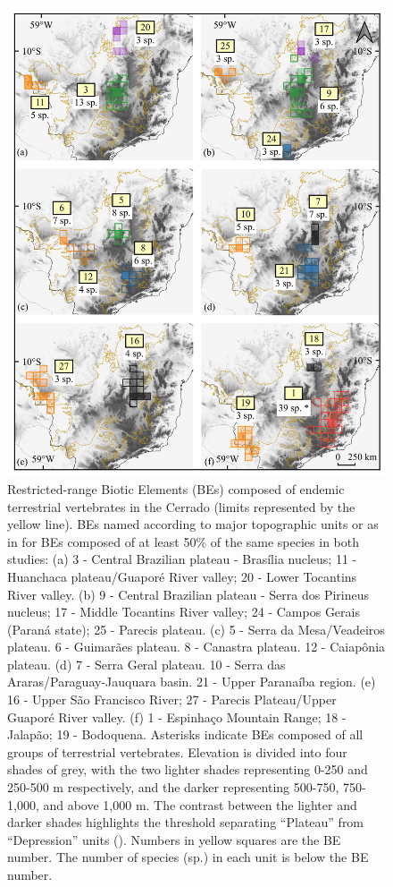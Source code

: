 \documentclass[12pt,openright,oneside,a4paper,english]{abntex2}
\begin{document}
\begin{figure}[H]
	\centering
	\includegraphics[width=150mm]{Fig c2-1}
	\caption[Restricted-range Biotic Elements (BEs)]{\footnotesize Restricted-range Biotic Elements (BEs) composed of endemic terrestrial vertebrates in the Cerrado (limits represented by the yellow line). BEs named according to major topographic units or as in \citet{Azevedo2016} for BEs composed of at least 50\% of the same species in both studies: (a) 3 - Central Brazilian plateau - Brasília nucleus; 11 - Huanchaca plateau/Guaporé River valley; 20 - Lower Tocantins River valley. (b) 9 - Central Brazilian plateau - Serra dos Pirineus nucleus; 17 - Middle Tocantins River valley; 24 - Campos Gerais (Paraná state); 25 - Parecis plateau. (c) 5 - Serra da Mesa/Veadeiros plateau. 6 - Guimarães plateau. 8 - Canastra plateau. 12 - Caiapônia plateau. (d) 7 - Serra Geral plateau. 10 - Serra das Araras/Paraguay-Jauquara basin. 21 - Upper Paranaíba region. (e) 16 - Upper São Francisco River; 27 - Parecis Plateau/Upper Guaporé River valley. (f) 1 - Espinhaço Mountain Range; 18 - Jalapão; 19 - Bodoquena. Asterisks indicate BEs composed of all groups of terrestrial vertebrates. Elevation is divided into four shades of grey, with the two lighter shades representing 0-250 and 250-500 m respectively, and the darker representing 500-750, 750-1,000, and above 1,000 m. The contrast between the lighter and darker shades highlights the  threshold separating “Plateau” from “Depression” units (\citealp[see][]{Silva1997}). Numbers in yellow squares are the BE number. The number of species (sp.) in each unit is below the BE number.}
	\label{fig:fig2-1}
\end{figure}
\end{document}
